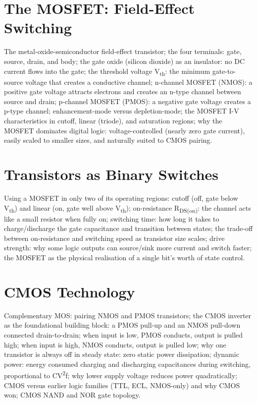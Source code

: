 \chapter{The MOSFET: Field-Effect Switching}
\label{ch:mosfet}

The metal-oxide-semiconductor field-effect transistor; the four terminals:
gate, source, drain, and body; the gate oxide (silicon dioxide) as an
insulator: no DC current flows into the gate; the threshold voltage
V\textsubscript{th}: the minimum gate-to-source voltage that creates a
conductive channel; n-channel MOSFET (NMOS): a positive gate voltage
attracts electrons and creates an n-type channel between source and drain;
p-channel MOSFET (PMOS): a negative gate voltage creates a p-type channel;
enhancement-mode versus depletion-mode; the MOSFET I-V characteristics in
cutoff, linear (triode), and saturation regions; why the MOSFET dominates
digital logic: voltage-controlled (nearly zero gate current), easily scaled
to smaller sizes, and naturally suited to CMOS pairing.

\chapter{Transistors as Binary Switches}
\label{ch:transistors-as-switches}

Using a MOSFET in only two of its operating regions: cutoff (off, gate below
V\textsubscript{th}) and linear (on, gate well above V\textsubscript{th});
on-resistance R\textsubscript{DS(on)}: the channel acts like a small resistor
when fully on; switching time: how long it takes to charge/discharge the gate
capacitance and transition between states; the trade-off between on-resistance
and switching speed as transistor size scales; drive strength: why some logic
outputs can source/sink more current and switch faster; the MOSFET as the
physical realisation of a single bit's worth of state control.

\chapter{CMOS Technology}
\label{ch:cmos-intro}

Complementary MOS: pairing NMOS and PMOS transistors; the CMOS inverter as
the foundational building block: a PMOS pull-up and an NMOS pull-down
connected drain-to-drain; when input is low, PMOS conducts, output is pulled
high; when input is high, NMOS conducts, output is pulled low; why one
transistor is always off in steady state: zero static power dissipation;
dynamic power: energy consumed charging and discharging capacitances during
switching, proportional to CV\textsuperscript{2}f; why lower supply voltage
reduces power quadratically; CMOS versus earlier logic families (TTL, ECL,
NMOS-only) and why CMOS won; CMOS NAND and NOR gate topology.

